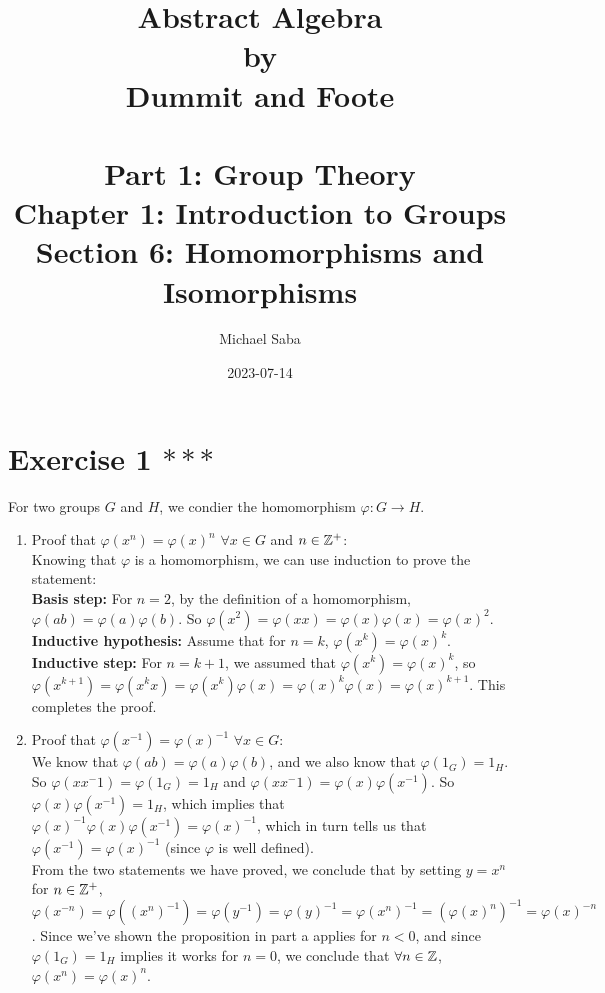 \documentclass[12pt]{article}
\title{%
    \Huge Abstract Algebra \\
    \large by \\
    \Large Dummit and Foote \\~\\
    \huge Part 1: Group Theory \\
    \LARGE Chapter 1: Introduction to Groups \\
    \Large Section 6: Homomorphisms and Isomorphisms
}
\date{2023-07-14}
\author{Michael Saba}
\begin{document}
    \maketitle
    \newpage
    \setlength{\parindent}{0pt}


    \section*{Exercise 1 $***$}
    For two groups $G$ and $H$,
    we condier the homomorphism $\varphi: G \to H$. \\ 
    \begin{enumerate}[label=\textbf{\alph*.}]
        \item 
            Proof that $\varphi(x^n) = \varphi(x)^n$ $\forall x \in G$
            and $n \in \mathbb{Z}^+$: \\
            Knowing that $\varphi$ is a homomorphism,
            we can use induction to prove the statement: \\
            \textbf{Basis step:}
            For $n = 2$,
            by the definition of a homomorphism,
            $\varphi(ab) = \varphi(a)\varphi(b)$.
            So $\varphi(x^2) = \varphi(xx)
            = \varphi(x)\varphi(x)
            = \varphi(x)^2$. \\
            \textbf{Inductive hypothesis:}
            Assume that for $n = k$, $\varphi(x^k) = \varphi(x)^k$. \\ 
            \textbf{Inductive step:}
            For $n = k+1$,
            we assumed that $\varphi(x^k) = \varphi(x)^k$,
            so $\varphi(x^{k+1}) = \varphi(x^kx)
            = \varphi(x^k)\varphi(x)
            = \varphi(x)^k\varphi(x)
            = \varphi(x)^{k+1}$.
            This completes the proof.
        \item
            Proof that $\varphi(x^{-1}) = \varphi(x)^{-1}$
            $\forall x \in G$: \\
            We know that $\varphi(ab) = \varphi(a)\varphi(b)$,
            and we also know that $\varphi(1_G) = 1_H$.
            So $\varphi(xx^-1) = \varphi(1_G) = 1_H$
            and $\varphi(xx^-1) = \varphi(x)\varphi(x^{-1})$.
            So $\varphi(x)\varphi(x^{-1}) = 1_H$,
            which implies that
            $\varphi(x)^{-1}\varphi(x)\varphi(x^{-1}) = \varphi(x)^{-1}$,
            which in turn tells us that
            $\varphi(x^{-1}) = \varphi(x)^{-1}$
            (since $\varphi$ is well defined). \\
            From the two statements we have proved,
            we conclude that by setting $y = x^n$ for $n \in \mathbb{Z}^+$,
            $ \varphi(x^{-n}) = \varphi((x^n)^{-1})
            = \varphi(y^{-1})
            = \varphi(y)^{-1}
            = \varphi(x^n)^{-1}
            = (\varphi(x)^n)^{-1}
            = \varphi(x)^{-n}$.
            Since we've shown the proposition in part a applies for $n < 0$,
            and since $\varphi(1_G) = 1_H$ implies it works for
            $n = 0$, we conclude that $\forall n \in \mathbb{Z}$, 
            $\varphi(x^n) = \varphi(x)^n$.
    \end{enumerate}
\end{document}

